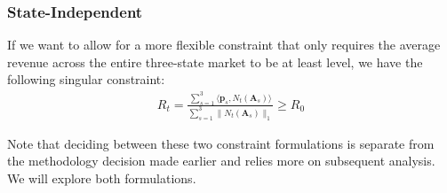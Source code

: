 \documentclass[11pt, titlepage]{report}
\begin{document}
\subsubsection*{State-Independent}
If we want to allow for a more flexible constraint that only requires the average revenue across the entire three-state market to be at least level, we have the following singular constraint:
\begin{align*}
  R_{t} =
  \frac{\sum_{s = 1}^3 \langle \mathbf{p}_s, N_t(\mathbf{A}_s) \rangle}
       {\sum_{s = 1}^3 \|N_t(\mathbf{A}_s)\|_1} \geq R_{0}
\end{align*}

Note that deciding between these two constraint formulations is separate from the methodology decision made earlier and relies more on subsequent analysis. We will explore both formulations.
\end{document}
